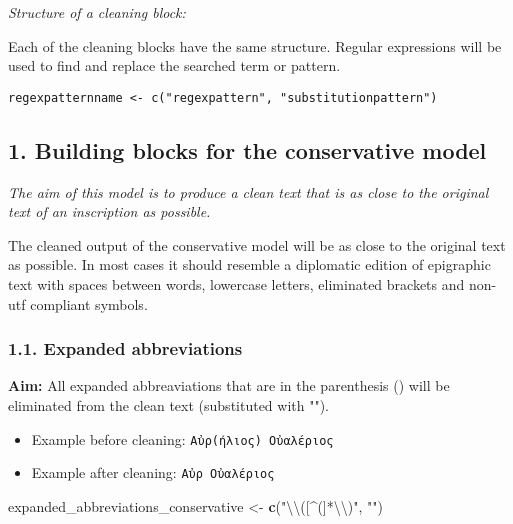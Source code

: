 \documentclass[]{article}
\newenvironment{Shaded}{\begin{snugshade}}{\end{snugshade}}
\newcommand{\CharTok}[1]{\textcolor[rgb]{0.31,0.60,0.02}{#1}}
\newcommand{\KeywordTok}[1]{\textcolor[rgb]{0.13,0.29,0.53}{\textbf{#1}}}
\newcommand{\NormalTok}[1]{#1}
\newcommand{\StringTok}[1]{\textcolor[rgb]{0.31,0.60,0.02}{#1}}
\providecommand{\tightlist}{%
  \setlength{\itemsep}{0pt}\setlength{\parskip}{0pt}}
\begin{document}
\emph{Structure of a cleaning block:}

Each of the cleaning blocks have the same structure. Regular expressions
will be used to find and replace the searched term or pattern.

\texttt{regexpatternname\ \textless{}-\ c("regexpattern",\ "substitutionpattern")}

\hypertarget{building-blocks-for-the-conservative-model}{%
\subsection{1. Building blocks for the conservative
model}\label{building-blocks-for-the-conservative-model}}

\emph{The aim of this model is to produce a clean text that is as close
to the original text of an inscription as possible.}

The cleaned output of the conservative model will be as close to the
original text as possible. In most cases it should resemble a diplomatic
edition of epigraphic text with spaces between words, lowercase letters,
eliminated brackets and non-utf compliant symbols.

\hypertarget{expanded-abbreviations}{%
\subsubsection{1.1. Expanded
abbreviations}\label{expanded-abbreviations}}

\textbf{Aim:} All expanded abbreaviations that are in the parenthesis ()
will be eliminated from the clean text (substituted with "").

\begin{itemize}
\tightlist
\item
  Example before cleaning: \texttt{Αὐρ(ήλιος)\ Οὐαλέριος}
\item
  Example after cleaning: \texttt{Αὐρ\ Οὐαλέριος}
\end{itemize}

\begin{Shaded}
\begin{Highlighting}[]
\NormalTok{expanded_abbreviations_conservative <-}\StringTok{ }\KeywordTok{c}\NormalTok{(}\StringTok{"}\CharTok{\textbackslash{}\textbackslash{}}\StringTok{([^(]*}\CharTok{\textbackslash{}\textbackslash{}}\StringTok{)"}\NormalTok{, }\StringTok{""}\NormalTok{)}
\end{Highlighting}
\end{Shaded}
\end{document}
